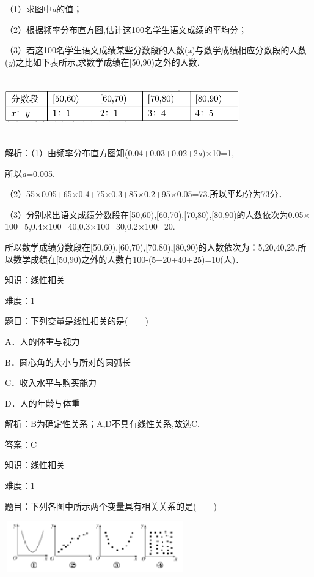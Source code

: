 \documentclass{article} %
\begin{document}
（1）求图中\textit{a}的值；

（2）根据频率分布直方图,估计这100名学生语文成绩的平均分；

（3）若这100名学生语文成绩某些分数段的人数(\textit{x})与数学成绩相应分数段的人数(\textit{y})之比如下表所示,求数学成绩在[50,90)之外的人数.

\includegraphics*[width=4in, height=1in, keepaspectratio=false]{image121}

解析：（1）由频率分布直方图知(0.04+0.03+0.02+2\textit{a})$\mathrm{\times}$10=1,

所以\textit{a}=0.005.

（2）55$\mathrm{\times}$0.05+65$\mathrm{\times}$0.4+75$\mathrm{\times}$0.3+85$\mathrm{\times}$0.2+95$\mathrm{\times}$0.05=73.所以平均分为73分．

（3）分别求出语文成绩分数段在[50,60),[60,70),[70,80),[80,90)的人数依次为0.05$\mathrm{\times}$100=5,0.4$\mathrm{\times}$100=40,0.3$\mathrm{\times}$100=30,0.2$\mathrm{\times}$100=20.

所以数学成绩分数段在[50,60),[60,70),[70,80),[80,90)的人数依次为：5,20,40,25.所以数学成绩在[50,90)之外的人数有100-(5+20+40+25)=10(人)．

知识：线性相关

难度：1

题目：下列变量是线性相关的是(　　)

A．人的体重与视力

B．圆心角的大小与所对的圆弧长

C．收入水平与购买能力

D．人的年龄与体重

解析：B为确定性关系；A,D不具有线性关系,故选C.

答案：C

知识：线性相关

难度：1

题目：下列各图中所示两个变量具有相关关系的是(　　)

\includegraphics*[width=3.07in, height=0.87in, keepaspectratio=false]{image96}
\end{document}

